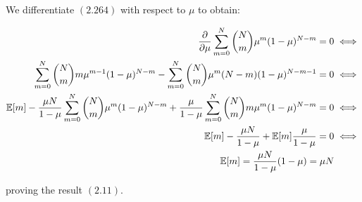 We differentiate $(2.264)$ with respect to $\mu$ to obtain:

\begin{align*}
    \frac{\partial}{\partial \mu} \sum_{m=0}^{N} \binom{N}{m} \mu^m (1 - \mu)^{N-m} = 0 &\iff \\
    \sum_{m=0}^{N} \binom{N}{m} m \mu^{m-1} (1 - \mu)^{N-m} - \sum_{m=0}^{N} \binom{N}{m} \mu^m (N-m)(1 - \mu)^{N-m-1} = 0 &\iff \\
    \operatorname*{\mathbb{E}}[m] - \frac{\mu N}{1-\mu} \sum_{m=0}^{N} \binom{N}{m} \mu^{m} (1 - \mu)^{N-m} + \frac{\mu}{1 - \mu} \sum_{m=0}^{N} \binom{N}{m} m \mu^m (1 - \mu)^{N-m} = 0 &\iff \\
    \operatorname*{\mathbb{E}}[m] - \frac{\mu N}{1-\mu} + \operatorname*{\mathbb{E}}[m] \frac{\mu}{1 - \mu} = 0 &\iff \\
    \operatorname*{\mathbb{E}}[m] = \frac{\mu N}{1 - \mu} (1 - \mu) = \mu N
\end{align*}

proving the result $(2.11)$.